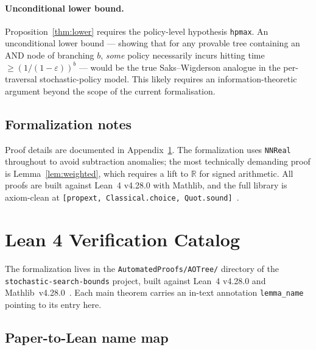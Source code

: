 \documentclass[reqno,11pt]{amsart}
\newcommand{\RR}{\mathbb{R}}
\newcommand{\lean}[1]{\textup{\texttt{\small #1}}}
\theoremstyle{plain}
\theoremstyle{definition}
\theoremstyle{remark}
\begin{document}
\paragraph{Unconditional lower bound.} Proposition~\ref{thm:lower} requires the policy-level hypothesis \texttt{hpmax}. An unconditional lower bound --- showing that for any provable tree containing an AND node of branching $b$, \emph{some} policy necessarily incurs hitting time $\ge (1/(1-\varepsilon))^b$ --- would be the true Saks--Wigderson analogue in the per-traversal stochastic-policy model. This likely requires an information-theoretic argument beyond the scope of the current formalisation.

\subsection{Formalization notes}

Proof details are documented in Appendix~\ref{app:lean}. The formalization uses \texttt{NNReal} throughout to avoid subtraction anomalies; the most technically demanding proof is Lemma~\ref{lem:weighted}, which requires a lift to $\RR$ for signed arithmetic. All proofs are built against Lean~4 v4.28.0 with Mathlib, and the full library is axiom-clean at \texttt{[propext, Classical.choice, Quot.sound]}~\citep{deMouraUllrich2021,Mathlib2020,Aristotle2024}.

\appendix

\section{Lean 4 Verification Catalog}\label{app:lean}

The formalization lives in the \texttt{AutomatedProofs/AOTree/} directory of the \texttt{stochastic-search-bounds} project, built against Lean~4 v4.28.0 and Mathlib~v4.28.0~\citep{deMouraUllrich2021,Mathlib2020}. Each main theorem carries an in-text annotation \lean{lemma\_name} pointing to its entry here.

\subsection*{Paper-to-Lean name map}
\end{document}
